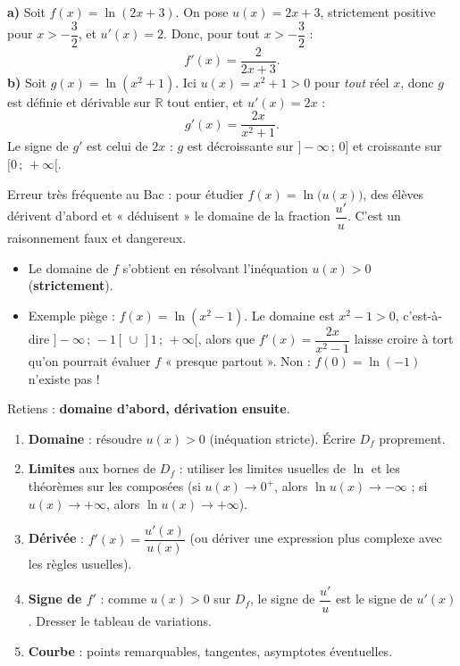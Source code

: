 \documentclass[11pt]{article}
\begin{document}
\begin{exemplebox}
\textbf{a)} Soit $f(x) = \ln(2x+3)$. On pose $u(x)=2x+3$, strictement positive pour $x>-\dfrac{3}{2}$, et $u'(x)=2$. Donc, pour tout $x>-\dfrac{3}{2}$ :
\[ f'(x) = \frac{2}{2x+3}. \]
\textbf{b)} Soit $g(x) = \ln(x^2+1)$. Ici $u(x)=x^2+1>0$ pour \emph{tout} réel $x$, donc $g$ est définie et dérivable sur $\mathbb{R}$ tout entier, et $u'(x)=2x$ :
\[ g'(x) = \frac{2x}{x^2+1}. \]
Le signe de $g'$ est celui de $2x$ : $g$ est décroissante sur $]-\infty\,;\,0]$ et croissante sur $[0\,;\,+\infty[$.
\end{exemplebox}

\begin{attention}
Erreur très fréquente au Bac : pour étudier $f(x)=\ln\bigl(u(x)\bigr)$, des élèves dérivent d'abord et « déduisent » le domaine de la fraction $\dfrac{u'}{u}$. C'est un raisonnement faux et dangereux.
\begin{itemize}
\item Le domaine de $f$ s'obtient en résolvant l'inéquation $u(x)>0$ (\textbf{strictement}).
\item Exemple piège : $f(x)=\ln(x^2-1)$. Le domaine est $x^2-1>0$, c'est-à-dire $]-\infty\,;\,-1[\,\cup\,]1\,;\,+\infty[$, alors que $f'(x)=\dfrac{2x}{x^2-1}$ laisse croire à tort qu'on pourrait évaluer $f$ « presque partout ». Non : $f(0)=\ln(-1)$ n'existe pas !
\end{itemize}
Retiens : \textbf{domaine d'abord, dérivation ensuite}.
\end{attention}

\begin{methode}
\begin{enumerate}
\item \textbf{Domaine} : résoudre $u(x)>0$ (inéquation stricte). Écrire $D_f$ proprement.
\item \textbf{Limites} aux bornes de $D_f$ : utiliser les limites usuelles de $\ln$ et les théorèmes sur les composées (si $u(x)\to 0^+$, alors $\ln u(x)\to -\infty$ ; si $u(x)\to +\infty$, alors $\ln u(x)\to +\infty$).
\item \textbf{Dérivée} : $f'(x)=\dfrac{u'(x)}{u(x)}$ (ou dériver une expression plus complexe avec les règles usuelles).
\item \textbf{Signe de $f'$} : comme $u(x)>0$ sur $D_f$, le signe de $\dfrac{u'}{u}$ est le signe de $u'(x)$. Dresser le tableau de variations.
\item \textbf{Courbe} : points remarquables, tangentes, asymptotes éventuelles.
\end{enumerate}
\end{methode}
\end{document}
